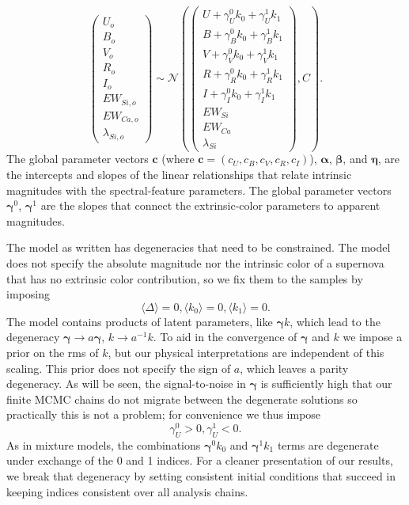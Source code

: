 \documentclass{aastex61}   	%
\begin{document}
\begin{equation}
\begin{pmatrix}
U_o\\B_o\\ V_o\\R_o\\I_o\\EW_{Si, o}\\ EW_{Ca, o} \\ \lambda_{Si, o}
\end{pmatrix}
\sim \mathcal{N}
\left(
\begin{pmatrix}
U +\gamma^0_{U} k_0 +\gamma^1_{U} k_1 \\B +\gamma^0_{B} k_0 +\gamma^1_{B} k_1 \\
V+\gamma^0_{V} k_0+\gamma^1_{V} k_1\\R+\gamma^0_{R} k_0 + \gamma^1_{R} k_1\\I+\gamma^0_{I} k_0+\gamma^1_{I} k_1\\
EW_{Si}\\ EW_{Ca} \\ \lambda_{Si}
\end{pmatrix}
,C
\right).
\label{dust:eqn}
\end{equation}
The global parameter vectors
$\mathbf{c}$ (where $\mathbf{c}=(c_U, c_B, c_V, c_R, c_I) $),
$\pmb{\alpha}$, $\pmb{\beta}$,  and $\pmb{\eta}$,  are the intercepts and slopes of the linear relationships that
relate intrinsic magnitudes with the spectral-feature parameters.
The global parameter vectors $\pmb{\gamma}^0$, $\pmb{\gamma}^1$  are the slopes that connect the extrinsic-color
parameters to apparent magnitudes.  

\color{purple}
The model as written  has degeneracies that need to be constrained.
The model does not specify the absolute magnitude nor the intrinsic color of a supernova that has no extrinsic color contribution,
so we fix them to the samples by imposing
\begin{equation}
\langle \Delta \rangle=0, \langle k_0 \rangle=0, \langle k_1 \rangle=0.
\end{equation}
The model contains products of latent parameters,
like $\pmb{\gamma} k$, which lead to the degeneracy $\pmb{\gamma} \rightarrow a\pmb{\gamma}$, $k \rightarrow a^{-1} k$.
To aid in the convergence of $\pmb{\gamma}$ and $k$ we impose a prior on the rms of $k$, but
our physical interpretations are independent of this scaling.
This prior does not specify the sign of $a$, which leaves a parity degeneracy.  As will be seen, the signal-to-noise in $\pmb{\gamma}$ is sufficiently
high that our finite MCMC chains do not migrate between the degenerate solutions so practically this is not a problem; for convenience
we thus impose 
\begin{equation}
\gamma^0_U > 0, \gamma^1_U < 0.
\end{equation}
As  in mixture models, the combinations $\pmb{\gamma}^0 k_0$ and $\pmb{\gamma}^1 k_1$ terms are degenerate under exchange of the 0 and 1 indices. For a cleaner presentation of our results, 
we break that degeneracy  by setting consistent initial conditions that succeed in keeping indices consistent over all analysis chains.  
\color{black}
\end{document}
